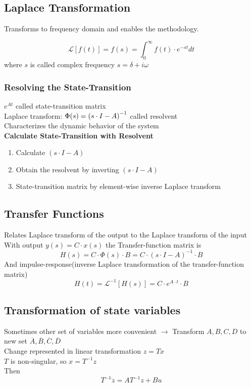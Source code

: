 \subsection{Laplace Transformation}%
\label{dls:sub:laplace_transformation}
Transforms to frequency domain and enables the methodology.

\[\mathcal{L}[f(t)] = f(s) = \int_0^\infty f(t) \cdot e^{-st}dt\]
where \(s\) is called complex frequency \(s = \delta + i\omega\)

\subsubsection{Resolving the State-Transition}%
\label{dls:ssub:resolving_the_state_transition}
\(e^{At}\) called state-transition matrix\\
Laplace transform: \(\Phi(s) = {(s \cdot I - A)}^{-1}\) called resolvent\\
Characterizes the dynamic behavior of the system\\

\textbf{Calculate State-Transition with Resolvent}
\begin{enumerate}
\item Calculate \((s \cdot I - A)\)
\item Obtain the resolvent by inverting \((s \cdot I - A)\)
\item State-transition matrix by element-wise inverse Laplace transform
\end{enumerate}

\subsection{Transfer Functions}%
\label{dls:sub:transfer_functions}
Relates Laplace transform of the output to the Laplace transform of the input\\
With output \(y(s) = C \cdot x(s)\)  the Transfer-function matrix is
\[H(s) = C \cdot \Phi (s) \cdot B = C \cdot {(s \cdot I - A)}^{-1} \cdot B\]
And impulse-response(inverse Laplace transformation of the transfer-function matrix)
\[H(t) = \mathcal{L}^{-1} [H(s)] = C \cdot e^{A \cdot t} \cdot B\]

\subsection{Transformation of state variables}%
\label{dls:sub:transformation_of_state_variables}
Sometimes other set of variables more convenient
\(\rightarrow\) Transform \(A, B, C, D\) to new set \(\overline{A}, \overline{B}, \overline{C}, \overline{D}\)\\
Change represented in linear transformation \(z=Tx\)\\
\(T\) is non-singular, so \(x = T^{-1}z\)\\
Then \[T^{-1}\dot{z} = AT^{-1}z + Bu\]